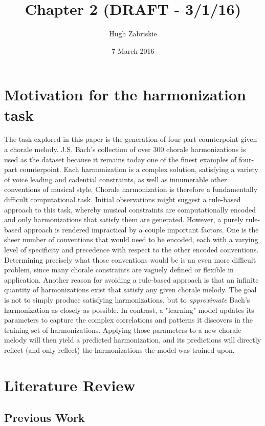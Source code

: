 \documentclass[11pt]{article}
\title{Chapter 2 (DRAFT - 3/1/16)}
\author{Hugh Zabriskie}
\date{7 March 2016}
\begin{document}
\maketitle{}

\section{Motivation for the harmonization task}

The task explored in this paper is the generation of four-part counterpoint given a chorale melody. J.S. Bach's collection of over 300 chorale harmonizations is used as the dataset because it remains today one of the finest examples of four-part counterpoint. Each harmonization is a complex solution, satisfying a variety of voice leading and cadential constraints, as well as innumerable other conventions of musical style. Chorale harmonization is therefore a fundamentally difficult computational task. Initial observations might suggest a rule-based approach to this task, whereby musical constraints are computationally encoded and only harmonizations that satisfy them are generated. However, a purely rule-based approach is rendered impractical by a couple important factors. One is the sheer number of conventions that would need to be encoded, each with a varying level of specificity and precedence with respect to the other encoded conventions. Determining precisely what those conventions would be is an even more difficult problem, since many chorale constraints are vaguely defined or flexible in application. Another reason for avoiding a rule-based approach is that an infinite quantity of harmonizations exist that satisfy any given chorale melody. The goal is not to simply produce satisfying harmonizations, but to \textit{approximate} Bach's harmonization as closely as possible. In contrast, a "learning" model updates its parameters to capture the complex correlations and patterns it discovers in the training set of harmonizations. Applying those parameters to a new chorale melody will then yield a predicted harmonization, and its predictions will directly reflect (and only reflect) the harmonizations the model was trained upon.
  
\section{Literature Review}

\subsection{Previous Work}
\end{document}
